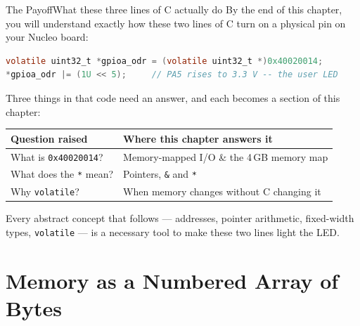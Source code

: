 \documentclass[9pt,aspectratio=169,xcolor=table]{beamer}
\newcommand{\striped}{\rowcolors{1}{white}{stripe}}
\begin{document}
\begin{frame}[fragile]{The Payoff}{What these three lines of C actually do}
    \leavevmode
    By the end of this chapter, you will understand \alert{exactly} how these two lines of C turn on a physical pin on your Nucleo board:

    \vspace{3mm}
    \begin{center}
    \begin{minipage}{.72\textwidth}
\begin{lstlisting}[language=C, basicstyle=\ttfamily\normalsize]
volatile uint32_t *gpioa_odr = (volatile uint32_t *)0x40020014;
*gpioa_odr |= (1U << 5);     // PA5 rises to 3.3 V -- the user LED
\end{lstlisting}
    \end{minipage}
    \end{center}

    \vspace{3mm}
    {\small Three things in that code need an answer, and each becomes a section of this chapter:}

    \vspace{1mm}
    \begin{center}
    {\small
    \striped
    \begin{tabular}{@{}l R{.56\textwidth}@{}}
        \toprule
        \textbf{Question raised} & \textbf{Where this chapter answers it} \\
        \midrule
        What is \texttt{0x40020014}? & Memory-mapped I/O \& the 4\,GB memory map \\
        What does the \texttt{*} mean? & Pointers, \texttt{\&} and \texttt{*} \\
        Why \texttt{volatile}? & When memory changes without C changing it \\
        \bottomrule
    \end{tabular}}
    \end{center}

    \vspace{1mm}
    {\small\centering Every abstract concept that follows --- addresses, pointer arithmetic, fixed-width types, \texttt{volatile} --- is a \alert{necessary tool} to make these two lines light the LED.\par}
\end{frame}

\section{Memory as a Numbered Array of Bytes}
\end{document}
